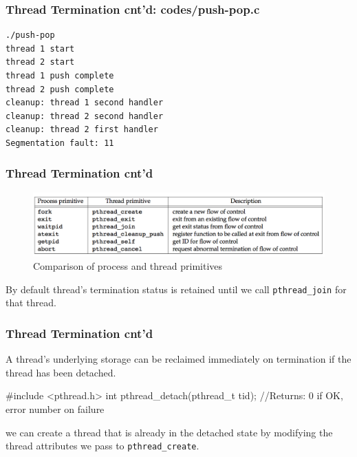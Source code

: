 \documentclass[newPxFont,sthlmFooter,nooffset]{beamer}
\begin{document}
\begin{frame}
  \frametitle{Thread Termination cnt'd: codes/push-pop.c }

  


\begin{verbatim}
./push-pop
thread 1 start
thread 2 start
thread 1 push complete
thread 2 push complete
cleanup: thread 1 second handler
cleanup: thread 2 second handler
cleanup: thread 2 first handler
Segmentation fault: 11
\end{verbatim}
\end{frame}


\begin{frame}[t]
  \frametitle{Thread Termination cnt'd}

  \begin{figure}[h]
    \centering
    \includegraphics[width=\linewidth]{figure/fig11-6}
    \caption{Comparison of process and thread primitives}
    \label{fig:work}
  \end{figure}  

By default thread’s termination status is retained until we call \texttt{pthread\_join} for that thread. 


\end{frame}

\begin{frame}[t,fragile]
  \frametitle{Thread Termination cnt'd}
  A thread’s underlying storage can be reclaimed immediately on termination if the thread has been detached.
  \begin{codedef}
#include <pthread.h>
int pthread_detach(pthread_t tid);
//Returns: 0 if OK, error number on failure    
  \end{codedef}

we can create a thread that is already in the detached state by modifying the thread attributes we pass to \texttt{pthread\_create}.

\end{frame}
\end{document}

